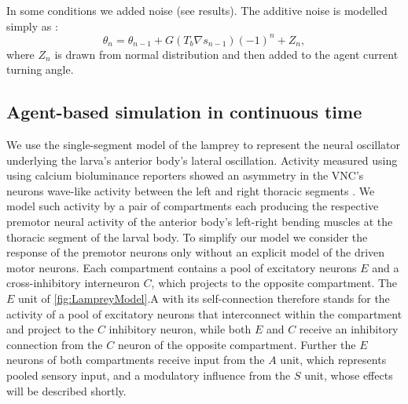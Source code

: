 \documentclass[10pt,a4paper]{article}
\begin{document}
In some conditions we added noise (see results). The additive noise is modelled simply as :
\begin{equation}
\theta_n = \theta_{n-1} + G (T_b \nabla s_{n-1})(-1)^n + Z_n,
\end{equation}
where $Z_n$ is drawn from normal distribution and then added to the agent current turning angle. 

 
\subsection{Agent-based simulation in continuous time}
We use the single-segment model of the lamprey \citep{lansner1997realistic} to represent the neural oscillator underlying the larva's anterior body's lateral oscillation. Activity measured using using calcium bioluminance reporters  showed an asymmetry in the VNC's neurons wave-like activity between the left and right thoracic segments \citep{berni2015genetic}. We model such activity by a pair of compartments each producing the respective premotor neural activity of the anterior  body's left-right bending muscles at the thoracic segment of the larval body. To simplify our model we consider the response of the premotor neurons only without an explicit model of the driven motor neurons. Each compartment contains a pool of excitatory neurons $E$ and a cross-inhibitory interneuron $C$, which projects to the opposite compartment. The $E$ unit of \ref{fig:LampreyModel}.A with its self-connection therefore stands for the activity of a pool of excitatory neurons that interconnect within the compartment and project to the $C$ inhibitory neuron, while both  $E$ and $C$ receive an inhibitory connection from the $C$ neuron of the opposite compartment. Further the $E$ neurons of both compartments receive input from the $A$ unit, which represents pooled sensory input, and a modulatory influence from the $S$ unit, whose effects will be described shortly.
\end{document}
